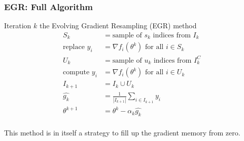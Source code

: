 \documentclass{beamer}
\begin{document}
		
	 		\begin{frame}
	 			\frametitle{EGR: Full Algorithm}

		\begin{block}{Iteration $k$ the Evolving Gradient Resampling (EGR) method}
	 	\begin{align*}
		S_k &=  \mbox{sample of } s_k \mbox{ indices from } I_{k}\\
		\mbox{replace } y_i &= \nabla f_i(\theta^k) \mbox{ for all } i \in S_k \\
		U_k &=  \mbox{sample of } u_k \mbox{ indices from }  I_{k}^C\\
		\mbox{compute } y_i &= \nabla f_i(\theta^k) \mbox{ for all } i \in U_k \\
		I_{k+1} &=  I_{k} \cup U_k\\
		\hat{g_k} & = \frac{1}{| I_{k+1} | } \sum_{i \in I_{k+1}} y_i \\ 
	   	\theta^{k+1} &= \theta^k - \alpha_k \hat{g_k}\\
	 	\end{align*}
		\end{block}
		This method is in itself a strategy to fill up the gradient memory from zero.
	 	    \end{frame}
		
		
		
\end{document}
